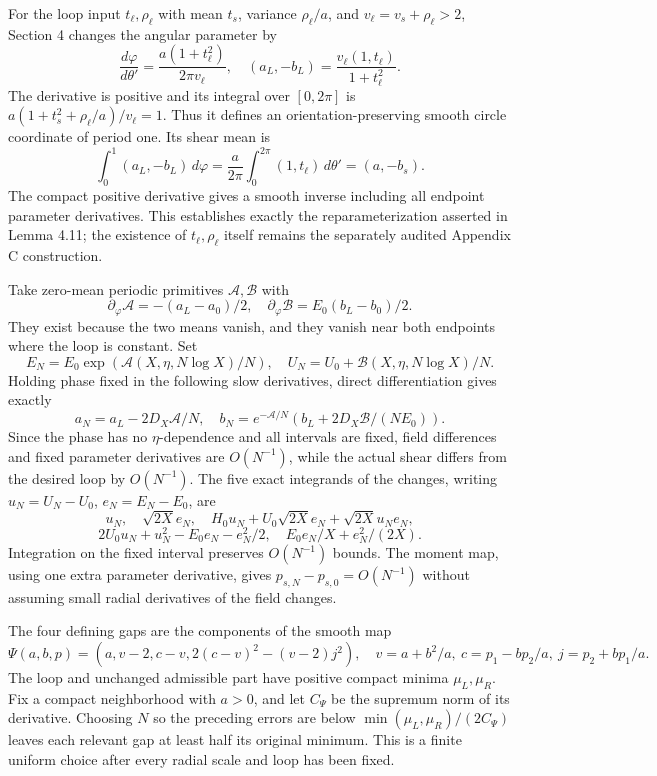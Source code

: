 \documentclass[10pt,a4paper]{article}
\begin{document}
For the loop input \(t_\ell,\rho_\ell\) with mean \(t_s\), variance \(\rho_\ell/a\), and \(v_\ell=v_s+\rho_\ell>2\), Section 4 changes the angular parameter by
\[
\frac{d\varphi}{d\theta'}=\frac{a(1+t_\ell^2)}{2\pi v_\ell},
\quad(a_L,-b_L)=\frac{v_\ell(1,t_\ell)}{1+t_\ell^2}.
\]
The derivative is positive and its integral over \([0,2\pi]\) is
\(a(1+t_s^2+\rho_\ell/a)/v_\ell=1\). Thus it defines an orientation-preserving smooth circle coordinate of period one. Its shear mean is
\[
\int_0^1(a_L,-b_L)\,d\varphi
=\frac a{2\pi}\int_0^{2\pi}(1,t_\ell)\,d\theta'
=(a,-b_s).
\]
The compact positive derivative gives a smooth inverse including all endpoint parameter derivatives. This establishes exactly the reparameterization asserted in Lemma 4.11; the existence of \(t_\ell,\rho_\ell\) itself remains the separately audited Appendix C construction.

Take zero-mean periodic primitives \(\mathscr A,\mathscr B\) with
\[
\partial_\varphi\mathscr A=-(a_L-a_0)/2,
\quad\partial_\varphi\mathscr B=E_0(b_L-b_0)/2.
\]
They exist because the two means vanish, and they vanish near both endpoints where the loop is constant. Set
\[
E_N=E_0\exp(\mathscr A(X,\eta,N\log X)/N),
\quad U_N=U_0+\mathscr B(X,\eta,N\log X)/N.
\]
Holding phase fixed in the following slow derivatives, direct differentiation gives exactly
\[
a_N=a_L-2D_X\mathscr A/N,
\quad b_N=e^{-\mathscr A/N}
\left(b_L+2D_X\mathscr B/(NE_0)\right).
\]
Since the phase has no \(\eta\)-dependence and all intervals are fixed, field differences and fixed parameter derivatives are \(O(N^{-1})\), while the actual shear differs from the desired loop by \(O(N^{-1})\). The five exact integrands of the changes, writing \(u_N=U_N-U_0\), \(e_N=E_N-E_0\), are
\[
u_N,\quad\sqrt{2X}e_N,\quad H_0u_N+U_0\sqrt{2X}e_N+\sqrt{2X}u_Ne_N,
\]
\[
2U_0u_N+u_N^2-E_0e_N-e_N^2/2,
\quad E_0e_N/X+e_N^2/(2X).
\]
Integration on the fixed interval preserves \(O(N^{-1})\) bounds. The moment map, using one extra parameter derivative, gives \(p_{s,N}-p_{s,0}=O(N^{-1})\) without assuming small radial derivatives of the field changes.

The four defining gaps are the components of the smooth map
\[
\Psi(a,b,p)=\left(a,v-2,c-v,2(c-v)^2-(v-2)j^2\right),
\quad v=a+b^2/a,\ c=p_1-bp_2/a,\ j=p_2+bp_1/a.
\]
The loop and unchanged admissible part have positive compact minima \(\mu_L,\mu_R\). Fix a compact neighborhood with \(a>0\), and let \(C_\Psi\) be the supremum norm of its derivative. Choosing \(N\) so the preceding errors are below \(\min(\mu_L,\mu_R)/(2C_\Psi)\) leaves each relevant gap at least half its original minimum. This is a finite uniform choice after every radial scale and loop has been fixed.
\end{document}
